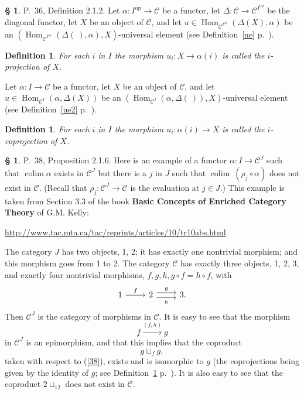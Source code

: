 \documentclass[12pt]{article}
\newtheorem{df}[thm]{Definition}%
\theoremstyle{remark}
\theoremstyle{definition}
\newtheorem{s}[thm]{\S}
\newcommand{\C}{\mathcal C}
\DeclareMathOperator*{\co}{colim}
\DeclareMathOperator{\Hom}{Hom}%
\DeclareMathOperator{\op}{op}
\begin{document}
%
%
\begin{s} 
P.~36, Definition 2.1.2. Let $\alpha:I^{\op}\to\C$ be a functor, let $\Delta:\C\to\C^{I^{\op}}$ be the diagonal functor, let $X$ be an object of $\C$, and let $u\in\Hom_{\C^{I^{\op}}}(\Delta(X),\alpha)$ be an $(\Hom_{\C^{I^{\op}}}(\Delta(\ ),\alpha),X)$-universal element (see Definition~\ref{ue} p.~\pageref{ue}). 
%
\begin{df}\label{p}
For each $i$ in $I$ the morphism $u_i:X\to\alpha(i)$ is called the $i$-{\em projection} of $X$.
\end{df}

Let $\alpha:I\to\C$ be a functor, let $X$ be an object of $\C$, and let $u\in\Hom_{\C^I}(\alpha,\Delta(X))$ be an $(\Hom_{\C^I}(\alpha,\Delta(\ )),X)$-universal element (see Definition~\ref{ue2} p.~\pageref{ue2}). 
%
\begin{df}\label{c}
For each $i$ in $I$ the morphism $u_i:\alpha(i)\to X$ is called the $i$-{\em coprojection} of $X$.
\end{df}
\end{s}
%
%
\begin{s}\label{c38}
P.~38, Proposition 2.1.6. Here is an example of a functor $\alpha:I\to\C^J$ such that $\co\alpha$ exists in $\C^J$ but there is a $j$ in $J$ such that $\co\ (\rho_j\circ\alpha)$ does not exist in $\C$. (Recall that $\rho_j:\C^J\to\C$ is the evaluation at $j\in J$.) This example is taken from Section 3.3 of the book \textbf{Basic Concepts of Enriched Category Theory} of G.M. Kelly:%
%
\begin{center}\href{http://www.tac.mta.ca/tac/reprints/articles/10/tr10abs.html}{http://www.tac.mta.ca/tac/reprints/articles/10/tr10abs.html}
\end{center}

The category $J$ has two objects, 1, 2; it has exactly one nontrivial morphism; and this morphism goes from 1 to 2. The category $\C$ has exactly three objects, 1, 2, 3, and exactly four nontrivial morphisms, $f,g,h,g\circ f=h\circ f$, with 
$$
\begin{tikzcd}
1\ar{r}{f}&2\ar[yshift=.7ex]{r}{g}\ar[yshift=-.7ex]{r}[swap]{h}&3.
\end{tikzcd}
$$ 
Then $\C^J$ is the category of morphisms in $\C$. It is easy to see that the morphism 
%
\begin{equation}\label{38}
f\xrightarrow{(f,h)}g 
\end{equation}
%
in $\C^J$ is an epimorphism, and that this implies that the coproduct 
$$
g\sqcup_fg,
$$ 
taken with respect to (\ref{38}), exists and is isomorphic to $g$ (the coprojections being given by the identity of $g$; see Definition~\ref{c} p.~\pageref{c}). It is also easy to see that the coproduct $2\sqcup_12$ does not exist in $\C$.
\end{s}
\end{document}
